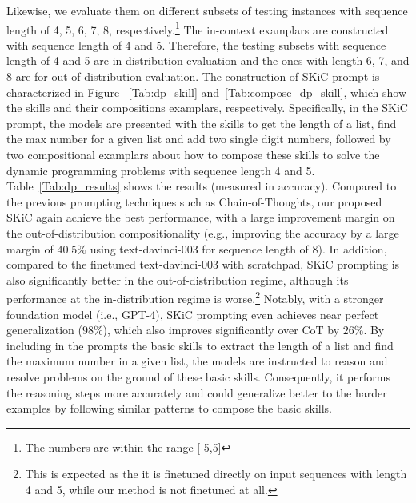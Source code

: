 Likewise, we evaluate them on different subsets of testing instances with sequence length of 4, 5, 6, 7, 8, respectively.\footnote{The numbers are within the range [-5,5]} The in-context examplars are constructed with sequence length of 4 and 5. Therefore, the testing subsets with sequence length of 4 and 5 are in-distribution evaluation and the ones with length 6, 7, and 8 are for out-of-distribution evaluation. The construction of SKiC prompt is characterized in Figure ~\ref{Tab:dp_skill} and~\ref{Tab:compose_dp_skill}, which show the skills and their compositions examplars, respectively. Specifically, in the SKiC prompt, the models are presented with the skills to get the length of a list, find the max number for a given list and add two single digit numbers, followed by two compositional examplars about how to compose these skills to solve the dynamic programming problems with sequence length 4 and 5. Table~\ref{Tab:dp_results} shows the results (measured in accuracy). Compared to the previous prompting techniques such as Chain-of-Thoughts, our proposed SKiC again achieve the best performance, with a large improvement margin on the out-of-distribution compositionality (e.g., improving the accuracy by a large margin of $40.5\%$ using text-davinci-003 for sequence length of $8$). In addition, compared to the finetuned text-davinci-003 with scratchpad, SKiC prompting is also significantly better in the out-of-distribution regime, although its performance at the in-distribution regime is worse.\footnote{This is expected as the it is finetuned directly on input sequences with length 4 and 5, while our method is not finetuned at all.} Notably, with a stronger foundation model (i.e., GPT-4), SKiC prompting even achieves near perfect generalization ($98\%$), which also improves significantly over CoT by $26\%$. By including in the prompts the basic skills to extract the length of a list and find the maximum number in a given list, the models are instructed to reason and resolve problems on the ground of these basic skills. Consequently, it performs the reasoning steps more accurately and could generalize better to the harder examples by following similar patterns to compose the basic skills.



























